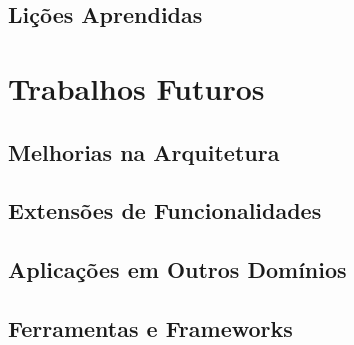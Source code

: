 \subsection{Lições Aprendidas}


\section{Trabalhos Futuros}


\subsection{Melhorias na Arquitetura}


\subsection{Extensões de Funcionalidades}


\subsection{Aplicações em Outros Domínios}


\subsection{Ferramentas e Frameworks}

